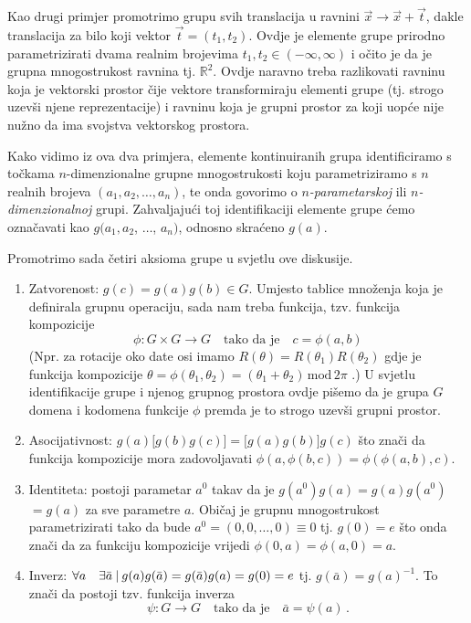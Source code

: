 \centerline{}

Kao drugi primjer promotrimo grupu svih translacija u ravnini $\vec{x}\to\vec{x}+\vec{t}$,
dakle translacija za bilo koji vektor $\vec{t}=(t_1, t_2)$.
Ovdje je elemente grupe prirodno parametrizirati dvama
realnim brojevima $t_1, t_2 \in (-\infty, \infty)$ i očito je da je
 grupna mnogostrukost ravnina tj. $\mathbb{R}^2$. Ovdje naravno treba
 razlikovati ravninu koja je vektorski prostor čije vektore transformiraju
 elementi grupe
 (tj. strogo uzevši njene reprezentacije) i ravninu koja je grupni prostor za koji uopće
 nije nužno da ima svojstva vektorskog prostora.

Kako vidimo iz ova dva primjera, elemente kontinuiranih grupa identificiramo
s točkama $n$-dimenzionalne grupne mnogostrukosti koju
parametriziramo s $n$ realnih brojeva
  $(a_1, a_2, \ldots, a_n)$,
te onda govorimo o \emph{$n$-parametarskoj} ili \emph{$n$-di\-men\-zi\-o\-nal\-noj} grupi.
Zahvaljajući toj identifikaciji
elemente grupe ćemo označavati kao $g(a_1, a_2$, $\ldots$, $a_n)$, odnosno
skraćeno $g(a)$.

Promotrimo sada četiri aksioma grupe u svjetlu ove diskusije.
\begin{enumerate}
\item Zatvorenost: $g(c)=g(a)g(b) \in G$. Umjesto tablice množenja koja
    je definirala grupnu operaciju, sada nam treba funkcija, tzv.
    funkcija kompozicije
    \[\phi: G\times G \to G \quad  \text{tako da je} \quad c=\phi(a,b) \]
    (Npr. za rotacije oko date osi imamo $R(\theta) = R(\theta_1) R(\theta_2)$
    gdje je funkcija kompozicije  $\theta = \phi(\theta_1, \theta_2) =
    (\theta_1 + \theta_2)\, \mathrm{mod}\, 2\pi$ .) U svjetlu identifikacije
    grupe i njenog grupnog prostora ovdje pišemo da je grupa $G$ domena i kodomena funkcije $\phi$
    premda je to strogo uzevši grupni prostor.

\item Asocijativnost: $g(a)\big[g(b)g(c)\big]=\big[g(a)g(b)\big]g(c)$ što
    znači da funkcija kompozicije mora zadovoljavati
    $\phi(a, \phi(b,c))=\phi(\phi(a,b),c) $.

\item Identiteta: postoji parametar $a^0$ takav da je 
       $g(a^0)g(a)$$=g(a)g(a^0)$$=g(a)$ za sve parametre $a$.
    Običaj je grupnu mnogostrukost parametrizirati tako da bude $a^0=(0, 0, \ldots, 0)
     \equiv 0$ tj. $g(0)=e$ što onda znači da za funkciju
     kompozicije vrijedi $\phi(0,a)=\phi(a,0)=a$.

\item Inverz: $\forall a\quad \exists \bar{a} \: | \: g(a)g(\bar{a})=
        g(\bar{a})g(a)=g(0)=e$ tj. $g(\bar{a})=g(a)^{-1}$. To znači
        da postoji tzv. funkcija inverza
        \[ \psi:G\to G   \quad  \text{tako da je} \quad \bar{a}=\psi(a) \,. \]

\end{enumerate}

